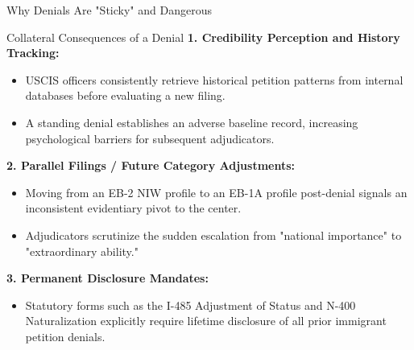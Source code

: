 \documentclass[11pt]{beamer}
\begin{document}
	\begin{frame}{Why Denials Are "Sticky" and Dangerous}
		\scriptsize
		\begin{block}{Collateral Consequences of a Denial}
			\textbf{1. Credibility Perception and History Tracking:}
			\begin{itemize}
				\item USCIS officers consistently retrieve historical petition patterns from internal databases before evaluating a new filing.
				\item A standing denial establishes an adverse baseline record, increasing psychological barriers for subsequent adjudicators.
			\end{itemize}
			\textbf{2. Parallel Filings / Future Category Adjustments:}
			\begin{itemize}
				\item Moving from an EB-2 NIW profile to an EB-1A profile post-denial signals an inconsistent evidentiary pivot to the center.
				\item Adjudicators scrutinize the sudden escalation from "national importance" to "extraordinary ability."
			\end{itemize}
			\textbf{3. Permanent Disclosure Mandates:}
			\begin{itemize}
				\item Statutory forms such as the I-485 Adjustment of Status and N-400 Naturalization explicitly require lifetime disclosure of all prior immigrant petition denials.
			\end{itemize}
		\end{block}
	\end{frame}
	
	
\end{document}
